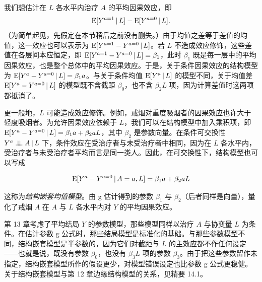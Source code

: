 我们想估计在 $L$ 各水平内治疗 $A$ 的平均因果效应，即
\[
\mathrm{E}[Y^{a=1}\,|\, L]-\mathrm{E}[Y^{a=0}\,|\, L].
\]
（为简单起见，先假定在本节稍后之前没有删失。）由于均值之差等于差值的均值，这一效应也可以表示为 $\mathrm{E}[Y^{a=1}-Y^{a=0}\,|\, L]$。若 $L$ 不造成效应修饰，这些差值在各层间本应恒定，即 $\mathrm{E}[Y^{a=1}-Y^{a=0}\,|\, L]=\beta_1$，此时 $\beta_1$ 既是每一层中的平均因果效应，也是整个总体中的平均因果效应。于是，关于条件因果效应的结构模型为 $\mathrm{E}[Y^a-Y^{a=0}\,|\, L]=\beta_1a$。与关于条件均值 $\mathrm{E}[Y^a\,|\, L]$ 的模型不同，关于均值差 $\mathrm{E}[Y^a-Y^{a=0}\,|\, L]$ 的模型既不含截距 $\beta_0$，也不含 $\beta_2L$ 项，因为计算差值时这两项都抵消了。

更一般地，$L$ 可能造成效应修饰。例如，戒烟对重度吸烟者的因果效应也许大于轻度吸烟者。为允许因果效应依赖于 $L$，我们可以在结构模型中加入乘积项，即 $\mathrm{E}[Y^a-Y^{a=0}\,|\, L]=\beta_1a+\beta_2aL$，其中 $\beta_2$ 是参数向量。在条件可交换性 $Y^a\perp\!\!\!\perp A\,|\, L$ 下，条件效应在受治疗者与未受治疗者中相同，因为在 $L$ 各水平内，受治疗者与未受治疗者平均而言是同一类人。因此，在可交换性下，结构模型也可以写成

\[
\mathrm{E}[Y^a-Y^{a=0}\,|\, A=a,L]=\beta_1a+\beta_2aL
\]

这称为\emph{结构嵌套均值模型}。由 g 估计得到的参数 $\beta_1$ 与 $\beta_2$（后者同样是向量），量化了戒烟 $A$ 在 $A$ 与 $L$ 各水平内对 $Y$ 的平均因果效应。

第 13 章考虑了平均结局 $Y$ 的参数模型，那些模型同样以治疗 $A$ 与协变量 $L$ 为条件。在估计参数 g 公式时，那些结局模型是标准化的基础。与那些参数模型不同，结构嵌套模型是半参数的，因为它们对截距与 $L$ 的主效应都不作任何设定——也就是说，既没有参数 $\beta_0$，也没有 $\beta_3L$ 项的参数 $\beta_3$。由于把这些参数留作未指定，结构嵌套模型所作的假设更少，对模型错误设定也比参数 g 公式更稳健。关于结构嵌套模型与第 12 章边缘结构模型的关系，见精要 14.1。


